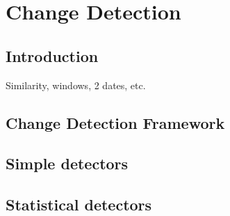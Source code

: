 \chapter{Change Detection}
\section{Introduction}
Similarity, windows, 2 dates, etc.
\section{Change Detection Framework}

\section{Simple detectors}

\section{Statistical detectors}
